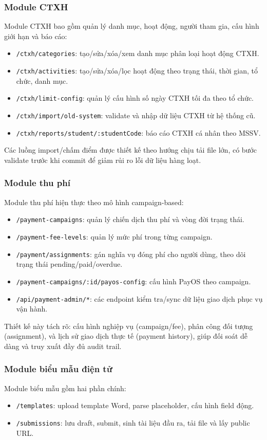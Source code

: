 \subsubsection{Module CTXH}
Module CTXH bao gồm quản lý danh mục, hoạt động, người tham gia, cấu hình giới hạn và báo cáo:
\begin{itemize}
	\item \texttt{/ctxh/categories}: tạo/sửa/xóa/xem danh mục phân loại hoạt động CTXH.
	\item \texttt{/ctxh/activities}: tạo/sửa/xóa/lọc hoạt động theo trạng thái, thời gian, tổ chức, danh mục.
	\item \texttt{/ctxh/limit-config}: quản lý cấu hình số ngày CTXH tối đa theo tổ chức.
	\item \texttt{/ctxh/import/old-system}: validate và nhập dữ liệu CTXH từ hệ thống cũ.
	\item \texttt{/ctxh/reports/student/:studentCode}: báo cáo CTXH cá nhân theo MSSV.
\end{itemize}

Các luồng import/chấm điểm được thiết kế theo hướng chịu tải file lớn, có bước validate trước khi commit để giảm rủi ro lỗi dữ liệu hàng loạt.

\subsubsection{Module thu phí}
Module thu phí hiện thực theo mô hình campaign-based:
\begin{itemize}
	\item \texttt{/payment-campaigns}: quản lý chiến dịch thu phí và vòng đời trạng thái.
	\item \texttt{/payment-fee-levels}: quản lý mức phí trong từng campaign.
	\item \texttt{/payment/assignments}: gán nghĩa vụ đóng phí cho người dùng, theo dõi trạng thái pending/paid/overdue.
	\item \texttt{/payment-campaigns/:id/payos-config}: cấu hình PayOS theo campaign.
	\item \texttt{/api/payment-admin/*}: các endpoint kiểm tra/sync dữ liệu giao dịch phục vụ vận hành.
\end{itemize}

Thiết kế này tách rõ: cấu hình nghiệp vụ (campaign/fee), phân công đối tượng (assignment), và lịch sử giao dịch thực tế (payment history), giúp đối soát dễ dàng và truy xuất đầy đủ audit trail.

\subsubsection{Module biểu mẫu điện tử}
Module biểu mẫu gồm hai phần chính:
\begin{itemize}
	\item \texttt{/templates}: upload template Word, parse placeholder, cấu hình field động.
	\item \texttt{/submissions}: lưu draft, submit, sinh tài liệu đầu ra, tải file và lấy public URL.
\end{itemize}

